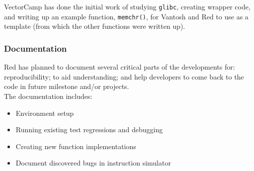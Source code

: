 VectorCamp has done the initial work of studying \texttt{glibc},
creating wrapper code, and writing up an example function, \texttt{memchr()},
for Vantosh and Red to use as a template (from which the other functions were
written up).

\subsubsection{Documentation}

Red has planned to document several critical parts of the developments for:
reproducibility; to aid understanding; and help developers to come back to
the code in future milestone and/or projects.\\

The documentation includes:

\begin{itemize}
  \item Environment setup
  \item Running existing test regressions and debugging
  \item Creating new function implementations
  \item Document discovered bugs in instruction simulator
\end{itemize}













\clearpage
